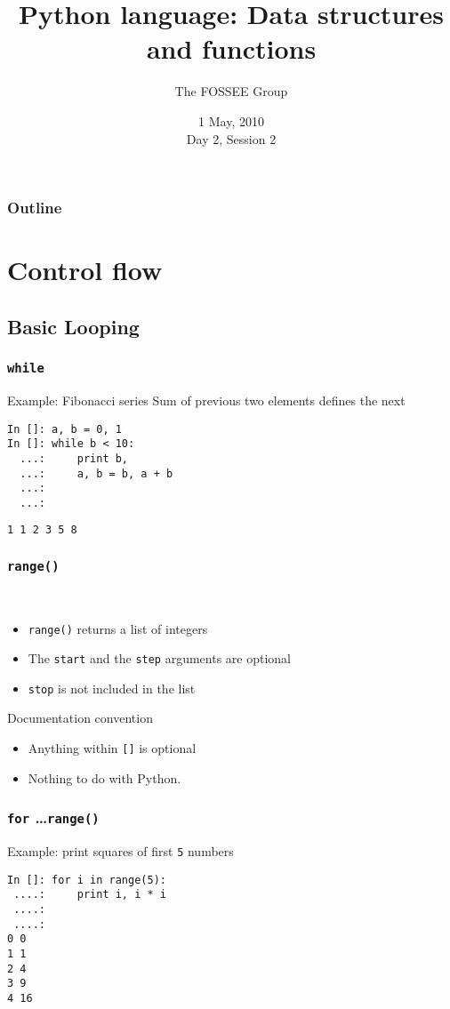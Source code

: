 \documentclass[14pt,compress]{beamer}
\title[Basic Python]{Python language: Data structures and functions}
\author[FOSSEE Team] {The FOSSEE Group}
\institute[IIT Bombay] {Department of Aerospace Engineering\\IIT Bombay}
\date[] {1 May, 2010\\Day 2, Session 2}
\newcommand{\typ}[1]{\lstinline{#1}}
\newcommand{\kwrd}[1]{ \texttt{\textbf{\color{blue}{#1}}}  }
\begin{document}
\begin{frame}
  \titlepage
\end{frame}

\begin{frame}
  \frametitle{Outline}
  \tableofcontents
\end{frame}

\section{Control flow}
\subsection{Basic Looping}
\begin{frame}[fragile]
  \frametitle{\typ{while}}
\begin{block}{Example: Fibonacci series}
  Sum of previous two elements defines the next
\end{block}
  \begin{lstlisting}
In []: a, b = 0, 1
In []: while b < 10:
  ...:     print b,
  ...:     a, b = b, a + b
  ...:
  ...:
\end{lstlisting}
\typ{1 1 2 3 5 8}\\
\end{frame}

\begin{frame}[fragile]
\frametitle{\typ{range()}}
\kwrd{range([start,] stop[, step])}\\
\begin{itemize}
  \item \typ{range()} returns a list of integers
  \item The \typ{start} and the \typ{step} arguments are optional
  \item \typ{stop} is not included in the list
\end{itemize}
\vspace*{.5in}
\begin{block}{Documentation convention}
  \begin{itemize}
    \item \alert{Anything within \typ{[]} is optional}
    \item Nothing to do with Python.
  \end{itemize}
\end{block}
\end{frame}

\begin{frame}[fragile]
  \frametitle{\texttt{for} \ldots \typ{range()}}
Example: print squares of first \typ{5} numbers
  \begin{lstlisting}
In []: for i in range(5):
 ....:     print i, i * i
 ....:
 ....:
0 0
1 1
2 4
3 9
4 16
\end{lstlisting}
\end{frame}
\end{document}

